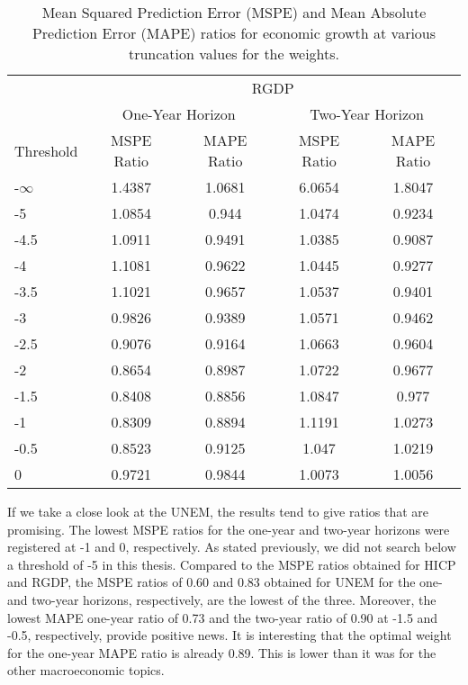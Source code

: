 \documentclass[11pt]{article}
\begin{document}
	\begin{table}[!h]
		\centering
		\caption{Mean Squared Prediction Error (MSPE) and Mean Absolute Prediction Error (MAPE) ratios for economic growth at various truncation values for the weights.}
		\label{tab: c MSPE RGDP}
		\begin{tabular}{lcccc}
			\hline\hline
			&                        \multicolumn{4}{c}{RGDP}                         \\
			\cmidrule(lr){2-5}                              & \multicolumn{2}{c}{One-Year Horizon} & \multicolumn{2}{c}{Two-Year Horizon} \\
			\cmidrule(lr){2-3} \cmidrule(lr){4-5}
			Threshold & MSPE Ratio &    MAPE Ratio    & MSPE Ratio &    MAPE Ratio    \\ \hline
			-$\infty$ & 1.4387 & 1.0681 & 6.0654 & 1.8047\\ 
			-5 & 1.0854 & 0.944 & 1.0474 & 0.9234\\ 
			-4.5 & 1.0911 & 0.9491 & 1.0385 & 0.9087\\ 
			-4 & 1.1081 & 0.9622 & 1.0445 & 0.9277\\ 
			-3.5 & 1.1021 & 0.9657 & 1.0537 & 0.9401\\ 
			-3 & 0.9826 & 0.9389 & 1.0571 & 0.9462\\ 
			-2.5 & 0.9076 & 0.9164 & 1.0663 & 0.9604\\ 
			-2 & 0.8654 & 0.8987 & 1.0722 & 0.9677\\ 
			-1.5 & 0.8408 & 0.8856 & 1.0847 & 0.977\\ 
			-1 & 0.8309 & 0.8894 & 1.1191 & 1.0273\\ 
			-0.5 & 0.8523 & 0.9125 & 1.047 & 1.0219\\ 
			0 & 0.9721 & 0.9844 & 1.0073 & 1.0056\\ 
			\hline\hline
		\end{tabular}
	\end{table}
	
	If we take a close look at the UNEM, the results tend to give ratios that are promising. The lowest MSPE ratios for the one-year and two-year horizons were registered at -1 and 0, respectively. As stated previously, we did not search below a threshold of -5 in this thesis. Compared to the MSPE ratios obtained for HICP and RGDP, the MSPE ratios of 0.60 and 0.83 obtained for UNEM for the one- and two-year horizons, respectively, are the lowest of the three.  Moreover, the lowest MAPE one-year ratio of 0.73 and the two-year ratio of 0.90 at -1.5 and -0.5, respectively, provide positive news. It is interesting that the optimal weight for the one-year MAPE ratio is already 0.89. This is lower than it was for the other macroeconomic topics.
	
\end{document}
